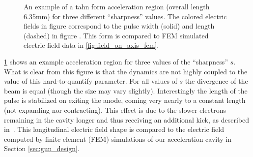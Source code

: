 \begin{figure}
  \centerline{
    \subfloat[][]{
      \label{fig:field_on_axis}
      \begin{tikzpicture}
        
      \end{tikzpicture}
    }
    \subfloat[][]{
      \label{fig:tanh_sharpness}
      
    }
  }
  \caption[An example of a tanh form acceleration region for three different ``sharpness'' values]{
    An example of a tahn form acceleration region (overall length 6.35mm) for three different ``sharpness'' values.
    The colored electric fields in figure \protect{} correspond to the pulse width (solid) and length (dashed) in figure \protect{}.
    This form is compared to FEM simulated electric field data in \ref{fig:field_on_axis_fem}.
  }
  \label{fig:gun-sharpness}
\end{figure}

\ref{fig:gun-sharpness} shows an example acceleration region for three values of the ``sharpness'' $s$.
What is clear from this figure is that the dynamics are not highly coupled to the value of this hard-to-quantify parameter.
For all values of $s$ the divergence of the beam is equal (though the size may vary slightly).
Interestingly the length of the pulse is stabilized on exiting the anode, coming very nearly to a constant length (not expanding nor contracting).
This effect is due to the slower electrons remaining in the cavity longer and thus receiving an additional kick, as described in~\cite{oudheusden_electron_2007}.
This longitudinal electric field shape is compared to the electric field computed by finite-element (FEM) simulations of our acceleration cavity in Section \ref{sec:gun_design}.


